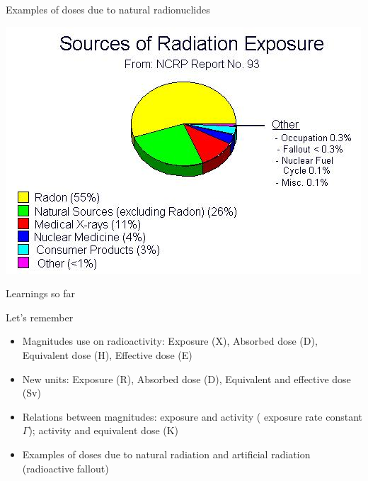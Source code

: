 \begin{frame}{Examples of doses due to natural radionuclides}

\centering
\includegraphics[scale=0.5]{figures/dosespopulation}

\end{frame}

\begin{frame}{Learnings so far}

\begin{alertblock}{Let's remember}

\begin{itemize}

\pause \item Magnitudes use on radioactivity: Exposure (X), Absorbed dose (D), Equivalent dose (H), Effective dose (E)

\pause \item New units: Exposure (R), Absorbed dose (D), Equivalent and effective dose (Sv)

\pause \item Relations between magnitudes: exposure and activity ( exposure rate constant $\Gamma$); activity and equivalent dose (K)

\pause \item Examples of doses due to natural radiation and artificial radiation (radioactive fallout)

\end{itemize}

\end{alertblock}

\end{frame}